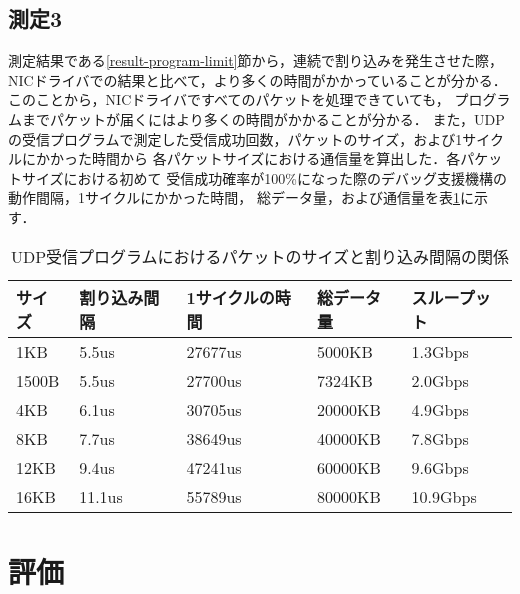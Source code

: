 \documentclass[12pt]{jsarticle}
\begin{document}
\subsection{測定3}

測定結果である\ref{result-program-limit}節から，連続で割り込みを発生させた際，
NICドライバでの結果と比べて，より多くの時間がかかっていることが分かる．
このことから，NICドライバですべてのパケットを処理できていても，
プログラムまでパケットが届くにはより多くの時間がかかることが分かる．
また，UDPの受信プログラムで測定した受信成功回数，パケットのサイズ，および1サイクルにかかった時間から
各パケットサイズにおける通信量を算出した．各パケットサイズにおける初めて
受信成功確率が100\%になった際のデバッグ支援機構の動作間隔，1サイクルにかかった時間，
総データ量，および通信量を表\ref{table:program}に示す．

\begin{table}[h]
    \caption{UDP受信プログラムにおけるパケットのサイズと割り込み間隔の関係}
    \label{table:program}
    \begin{center}
        \begin{tabular}{l|l|l|l|l}   \hline \hline 
            サイズ   & 割り込み間隔      & 1サイクルの時間      & 総データ量   & スループット       \\ \hline
            1KB      & 5.5us            & 27677us              & 5000KB       & 1.3Gbps            \\ 
            1500B    & 5.5us            & 27700us              & 7324KB       & 2.0Gbps            \\ 
            4KB      & 6.1us            & 30705us              & 20000KB      & 4.9Gbps            \\ 
            8KB      & 7.7us            & 38649us              & 40000KB      & 7.8Gbps            \\ 
            12KB     & 9.4us            & 47241us              & 60000KB      & 9.6Gbps            \\ 
            16KB     & 11.1us           & 55789us              & 80000KB      & 10.9Gbps           \\ \hline
        \end{tabular}
    \end{center}
\end{table}

\section{評価}
\end{document}
